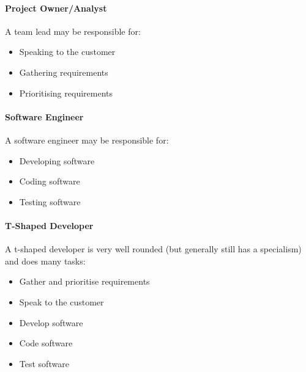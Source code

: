 \paragraph{Project Owner/Analyst}\label{par:project_owner_analyst}

A team lead may be responsible for:

\begin{itemize}
    \item Speaking to the customer
    \item Gathering requirements
    \item Prioritising requirements
\end{itemize}

\paragraph{Software Engineer}\label{par:software_engineer}

A software engineer may be responsible for:

\begin{itemize}
    \item Developing software
    \item Coding software
    \item Testing software
\end{itemize}

\paragraph{T-Shaped Developer}\label{par:t_shaped_developer}

A t-shaped developer is very well rounded (but generally still has a specialism) and does many tasks:

\begin{itemize}
    \item Gather and prioritise requirements
    \item Speak to the customer
    \item Develop software
    \item Code software
    \item Test software
\end{itemize}
